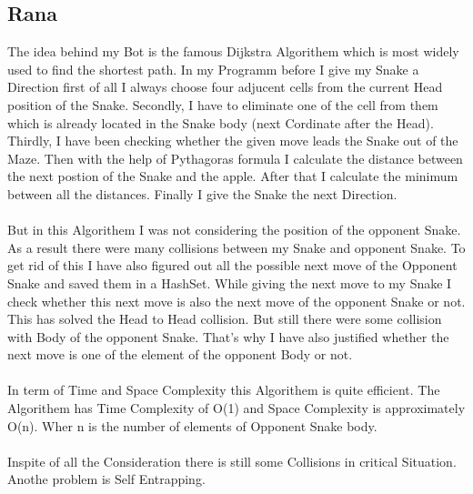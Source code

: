 \documentclass[a4paper,12pt]{article}
\begin{document}
\subsection{Rana}
The idea behind my Bot is the famous Dijkstra Algorithem which is most widely used to find the shortest path.
In my Programm before I give my Snake a Direction first of all I  always choose four adjucent cells from the current
Head position of the Snake. Secondly, I have to eliminate one of the cell from them which is already located in the Snake
body (next Cordinate after the Head). Thirdly, I have been checking whether the given move leads the Snake out of the Maze.
Then with the help of Pythagoras formula I calculate the distance between the next postion of the Snake  and the apple.
After that I calculate the minimum between all the distances. Finally I give the Snake the next Direction.\\
\\But in this Algorithem I was not considering the position of the opponent Snake. As a result there were many collisions between my Snake and opponent 
Snake. To get rid of this I have also figured out all the possible next move of the Opponent Snake and saved them in a HashSet. While giving the next move 
to my Snake I check whether this next move is also the next move of the opponent Snake or not. This has solved the Head to Head collision. But still there were some 
collision with Body of the opponent Snake. That's why I have also justified whether the next move is one of the element of the opponent Body or not.\\
\\In term of Time and Space Complexity this Algorithem is quite efficient. The Algorithem has Time Complexity of O(1) and Space
Complexity is approximately O(n). Wher n is the number of elements of Opponent Snake body. \\
\\Inspite of all the Consideration there is still some Collisions in critical Situation. Anothe problem is Self Entrapping.\\
\end{document}
